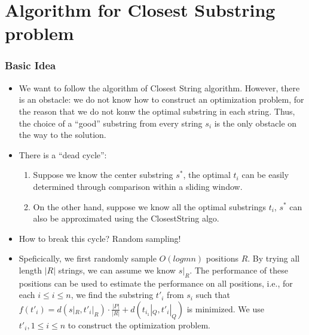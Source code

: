 \documentclass[slidestop,compress,mathserif,10pt]{beamer}
\begin{document}
\section{Algorithm for {\sc Closest Substring} problem}

\frame
{
\frametitle{Basic Idea}

\begin{itemize} 
 \item 

We want to follow the algorithm of {\sc Closest String} algorithm. However, there is an obstacle: we do not know how to construct an optimization problem, for the reason that we do not konw the optimal substring in each string. Thus, the choice of a ``good'' substring from every string $s_i$
is the only obstacle on the way to the solution.\\

\item There is a ``dead cycle'': 
\begin{enumerate} 
 \item Suppose we know the center substring $s^*$, the optimal $t_i$ can be easily determined through comparison within a sliding window. 
 \item On the other hand, suppose we know all the optimal substrings $t_i$, $s^*$ can also be approximated using the {\sc ClosestString} algo. 
\end{enumerate}

\item How to break this cycle? Random sampling!

\item Speficically, we first randomly sample $O(log m n )$ positions $R$. By trying all length $|R|$ strings, we can assume we know $s|_R$.  The performance of these positions can be used to estimate the performance on all positions, i.e., for each $i\le i \le n$, we find the substring $t'_i$ from $s_i$
such that $f(t'_i) = d(s|_R, t'_i|_R)\cdot \frac{|P|}{|R|} + d(t_{i_1}|_Q, t'_i|_Q)$ is minimized. 
We use $t'_i, 1\le i \le n$ to construct the optimization problem.

 \end{itemize}
}
\end{document}
